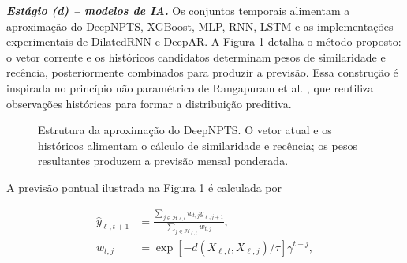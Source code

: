 \documentclass[11pt,a4paper]{article}
\begin{document}
\noindent\textbf{\textit{Estágio (d) -- modelos de IA.}} Os conjuntos temporais alimentam a aproximação do DeepNPTS, XGBoost, MLP, RNN, LSTM e as implementações experimentais de DilatedRNN e DeepAR. A Figura \ref{fig:deepnpts_interno} detalha o método proposto: o vetor corrente e os históricos candidatos determinam pesos de similaridade e recência, posteriormente combinados para produzir a previsão. Essa construção é inspirada no princípio não paramétrico de Rangapuram et al. \cite{rangapuram2023}, que reutiliza observações históricas para formar a distribuição preditiva.

\begin{figure}[htbp]
\centering
{}
\caption{Estrutura da aproximação do DeepNPTS. O vetor atual e os históricos alimentam o cálculo de similaridade e recência; os pesos resultantes produzem a previsão mensal ponderada.}
\label{fig:deepnpts_interno}
\end{figure}

A previsão pontual ilustrada na Figura \ref{fig:deepnpts_interno} é calculada por

\begin{equation}
\begin{aligned}
\hat{y}_{\ell,t+1}
&=\frac{\sum_{j\in\mathcal{H}_{\ell,t}}w_{t,j}y_{\ell,j+1}}
{\sum_{j\in\mathcal{H}_{\ell,t}}w_{t,j}},\\
w_{t,j}
&=\exp\!\left[-d(X_{\ell,t},X_{\ell,j})/\tau\right]\gamma^{t-j},
\end{aligned}
\label{eq:deepnpts}
\end{equation}
\end{document}
